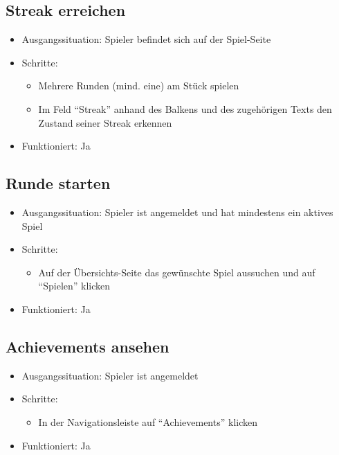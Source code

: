 \documentclass[a4paper]{scrreprt}
\begin{document}
            \subsection{Streak erreichen}
            \begin{itemize}
                \item Ausgangssituation: Spieler befindet sich auf der Spiel-Seite
                \item Schritte:
                    \begin{itemize}
                        \item Mehrere Runden (mind. eine) am Stück spielen
                        \item Im Feld \enquote{Streak} anhand des Balkens und des zugehörigen Texts den Zustand seiner Streak erkennen
                    \end{itemize}
                    \item Funktioniert: Ja
            \end{itemize}

            \subsection{Runde starten}
            \begin{itemize}
                \item Ausgangssituation: Spieler ist angemeldet und hat mindestens ein aktives Spiel
                \item Schritte:
                    \begin{itemize}
                        \item Auf der Übersichts-Seite das gewünschte Spiel aussuchen und auf \enquote{Spielen} klicken
                    \end{itemize}
                \item Funktioniert: Ja
            \end{itemize}

            \subsection{Achievements ansehen}
            \begin{itemize}
                \item Ausgangssituation: Spieler ist angemeldet
                \item Schritte:
                    \begin{itemize}
                        \item In der Navigationsleiste auf \enquote{Achievements} klicken
                    \end{itemize}
                \item Funktioniert: Ja
            \end{itemize}
\end{document}
